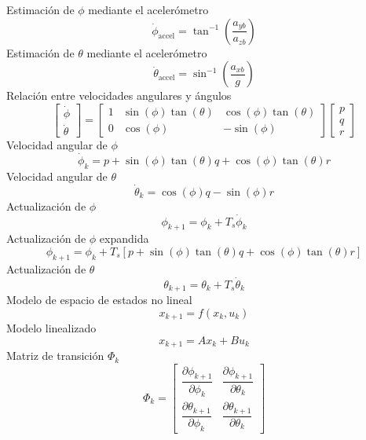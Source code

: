 \documentclass[11pt,a4paper]{article}
\begin{document}
Estimación de $\phi$ mediante el acelerómetro
\begin{equation}
\dot{\phi}_{\mathrm{accel}}
=
\tan^{-1}
\left(
\frac{a_{yb}}{a_{zb}}
\right)
\end{equation}
Estimación de $\theta$ mediante el acelerómetro
\begin{equation}
\dot{\theta}_{\mathrm{accel}}
=
\sin^{-1}
\left(
\frac{a_{xb}}{g}
\right)
\end{equation}
Relación entre velocidades angulares y ángulos
\begin{equation}
\begin{bmatrix}
\dot{\phi} \\
\dot{\theta}
\end{bmatrix}
=
\begin{bmatrix}
1 & \sin(\phi)\tan(\theta) & \cos(\phi)\tan(\theta) \\
0 & \cos(\phi) & -\sin(\phi)
\end{bmatrix}
\begin{bmatrix}
p \\
q \\
r
\end{bmatrix}
\end{equation}
Velocidad angular de $\phi$
\begin{equation}
\dot{\phi}_{k}
=
p
+
\sin(\phi)\tan(\theta)q
+
\cos(\phi)\tan(\theta)r
\end{equation}
Velocidad angular de $\theta$
\begin{equation}
\dot{\theta}_{k}
=
\cos(\phi)q
-
\sin(\phi)r
\end{equation}
Actualización de $\phi$
\begin{equation}
\phi_{k+1}
=
\phi_k
+
T_s\dot{\phi}_k
\end{equation}
Actualización de $\phi$ expandida
\begin{equation}
\phi_{k+1}
=
\phi_k
+
T_s
\left[
p
+
\sin(\phi)\tan(\theta)q
+
\cos(\phi)\tan(\theta)r
\right]
\end{equation}
Actualización de $\theta$
\begin{equation}
\theta_{k+1}
=
\theta_k
+
T_s\dot{\theta}_k
\end{equation}
 Modelo de espacio de estados no lineal
\begin{equation}
x_{k+1}
=
f(x_k,u_k)
\end{equation}
Modelo linealizado
\begin{equation}
x_{k+1}
=
Ax_k
+
Bu_k
\end{equation}
Matriz de transición $\Phi_k$
\begin{equation}
\Phi_k
=
\begin{bmatrix}
\dfrac{\partial\phi_{k+1}}{\partial\phi_k} &
\dfrac{\partial\phi_{k+1}}{\partial\theta_k} \\[8pt]
\dfrac{\partial\theta_{k+1}}{\partial\phi_k} &
\dfrac{\partial\theta_{k+1}}{\partial\theta_k}
\end{bmatrix}
\end{equation}
\end{document}
